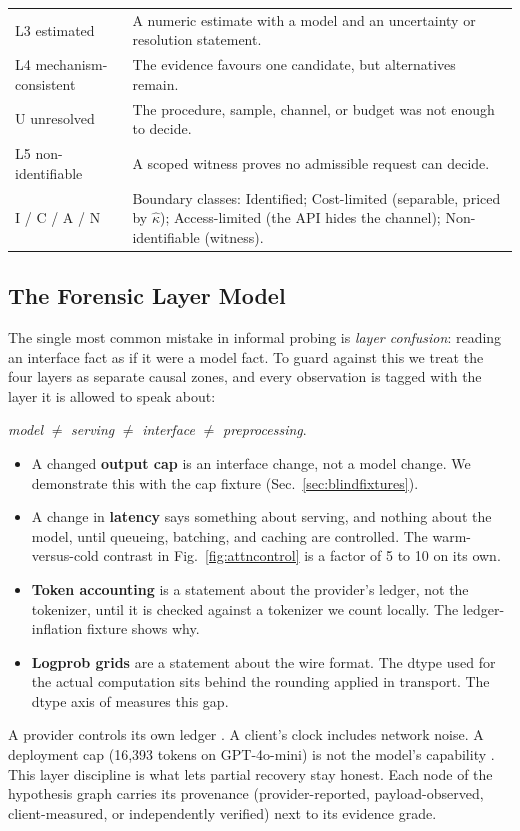 \begin{table}[!htb]
\begin{tabularx}{\textwidth}{@{}l Y@{}}
L3 estimated & A numeric estimate with a model and an uncertainty or resolution statement.\\
L4 mechanism-consistent & The evidence favours one candidate, but alternatives remain.\\
U unresolved & The procedure, sample, channel, or budget was not enough to decide.\\
L5 non-identifiable & A scoped witness proves no admissible request can decide.\\
\midrule
I / C / A / N & Boundary classes: Identified; Cost-limited (separable, priced by $\hat\kappa$); Access-limited (the API hides the channel); Non-identifiable (witness).\\
\bottomrule
\end{tabularx}
\end{table}

\subsection{The Forensic Layer Model}
\label{sec:layers}
The single most common mistake in informal probing is \emph{layer confusion}: reading an
interface fact as if it were a model fact.  To guard against this we treat the four
layers as separate causal zones, and every observation is tagged with the layer it is
allowed to speak about:
\begin{center}
\emph{model} $\neq$ \emph{serving} $\neq$ \emph{interface} $\neq$ \emph{preprocessing}.
\end{center}
\begin{itemize}
\item A changed \textbf{output cap} is an interface change, not a model change.  We
  demonstrate this with the cap fixture (Sec.~\ref{sec:blindfixtures}).
\item A change in \textbf{latency} says something about serving, and nothing about the
  model, until queueing, batching, and caching are controlled.  The warm-versus-cold
  contrast in Fig.~\ref{fig:attncontrol} is a factor of 5 to 10 on its own.
\item \textbf{Token accounting} is a statement about the provider's ledger, not the
  tokenizer, until it is checked against a tokenizer we count locally.  The
  ledger-inflation fixture shows why.
\item \textbf{Logprob grids} are a statement about the wire format.  The dtype used for
  the actual computation sits behind the rounding applied in transport.  The dtype axis
  of \benchname{} measures this gap.
\end{itemize}
A provider controls its own ledger \cite{chen2026tokeninflation}.  A client's clock
includes network noise.  A deployment cap (16{,}393 tokens on GPT-4o-mini) is not the
model's capability \cite{openaimini2024docs}.  This layer discipline is what lets partial
recovery stay honest.  Each node of the hypothesis graph carries its provenance
(provider-reported, payload-observed, client-measured, or independently verified) next
to its evidence grade.

